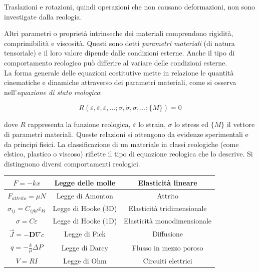 \documentclass[a4paper,12pt]{book}
\begin{document}
Traslazioni e rotazioni, quindi operazioni che non causano deformazioni, non sono investigate dalla reologia.

Altri parametri o proprietà intrinseche dei materiali comprendono rigidità, comprimibilità e viscosità.
Questi sono detti \textit{parametri materiali} (di natura tensoriale) e il loro valore dipende dalle condizioni esterne.
Anche il tipo di comportamento reologico può differire al variare delle condizioni esterne.\\

\noindent
La forma generale delle equazioni costitutive mette in relazione le quantità cinematiche e dinamiche attraverso dei parametri materiali, come si osserva nell'\textit{equazione di stato reologica}:

\begin{equation}
    R(\varepsilon, \dot{\varepsilon}, \ddot{\varepsilon}, ...; \sigma, \dot{\sigma}, \ddot{\sigma}, ...; \{M\} ) = 0
    \label{eq:reologia}
\end{equation}

\noindent
dove $R$ rappresenta la funzione reologica, $\varepsilon$ lo strain, $\sigma$ lo stress ed $\{M\}$ il vettore di parametri materiali.
Queste relazioni si ottengono da evidenze sperimentali e da principi fisici.
La classificazione di un materiale in classi reologiche (come elstico, plastico o viscoso) riflette il tipo di equazione reologica che lo descrive.
Si distinguono diversi comportamenti reologici.

\begin{table}[h]
    \centering
    \renewcommand{\arraystretch}{1.5}
    \setlength{\tabcolsep}{12pt}
    \begin{tabular}{|c|c|c|}
        \hline
        $F=-kx$ & Legge delle molle & Elasticità lineare \\ 
        \hline
        $F_{attrito}=\mu N$ & Legge di Amonton & Attrito \\ 
        \hline
        $\sigma_{ij}=C_{ijkl}\varepsilon_{kl}$ & Legge di Hooke (3D) & Elasticità tridimensionale \\ 
        \hline
        $\sigma=C\varepsilon$ & Legge di Hooke (1D) & Elasticità monodimensionale \\ 
        \hline
        $\vec{J}=-\boldsymbol{D}\nabla c$ & Legge di Fick & Diffusione \\ 
        \hline
        $q=-\frac{k}{\mu}\Delta P$ & Legge di Darcy & Flusso in mezzo poroso \\ 
        \hline
        $V=RI$ & Legge di Ohm & Circuiti elettrici \\ 
        \hline
    \end{tabular}
\end{table}
\end{document}
